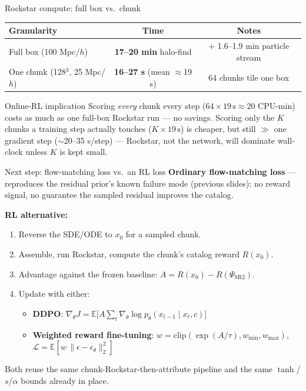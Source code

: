\documentclass[aspectratio=169]{beamer}
\begin{document}
\begin{frame}{Rockstar compute: full box vs.\ chunk}
\small
\centering
\begin{tabular}{l c c}
\hline
Granularity & Time & Notes \\
\hline
Full box (100 Mpc/$h$) & \textbf{17--20 min} halo-find & + 1.6--1.9 min particle stream \\
One chunk (128$^3$, 25 Mpc/$h$) & \textbf{16--27 s} (mean $\approx$19 s) & 64 chunks tile one box \\
\hline
\end{tabular}

\vspace{0.4cm}
\begin{block}{Online-RL implication}
Scoring \emph{every} chunk every step ($64\times19\,\mathrm s\approx20$ CPU-min)
costs as much as one full-box Rockstar run — no savings. Scoring only the
$K$ chunks a training step actually touches ($K\times19\,\mathrm s$) is cheaper,
but still $\gg$ one gradient step ($\sim$20--35 s/step) — Rockstar, not the
network, will dominate wall-clock unless $K$ is kept small.
\end{block}
\end{frame}

\begin{frame}{Next step: flow-matching loss vs.\ an RL loss}
\small
\textbf{Ordinary flow-matching loss} — reproduces the residual prior's known
failure mode (previous slides): no reward signal, no guarantee the sampled
residual improves the catalog.

\vspace{0.25cm}
\textbf{RL alternative:}
\begin{enumerate}
    \item Reverse the SDE/ODE to $x_0$ for a sampled chunk.
    \item Assemble, run Rockstar, compute the chunk's catalog reward $R(x_0)$.
    \item Advantage against the frozen baseline: $A = R(x_0) - R(\Psi_{\mathrm{SR2}})$.
    \item Update with either:
    \begin{itemize}
        \item \textbf{DDPO}: $\nabla_\theta J = \mathbb E\big[A \sum_t \nabla_\theta \log p_\theta(x_{t-1}\mid x_t, c)\big]$
        \item \textbf{Weighted reward fine-tuning}: $w=\mathrm{clip}(\exp(A/\tau), w_{\min}, w_{\max})$,
              $\mathcal L = \mathbb E[w\,\|\epsilon-\epsilon_\theta\|_2^2]$
    \end{itemize}
\end{enumerate}

\vspace{0.2cm}
Both reuse the same chunk-Rockstar-then-attribute pipeline and the same
$\tanh$/$s$/$\alpha$ bounds already in place.
\end{frame}
\end{document}

